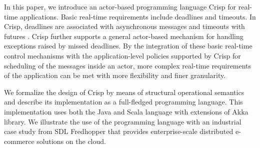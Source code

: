 In this paper, we introduce an actor-based programming language Crisp for real-time applications. 
Basic real-time requirements include deadlines and timeouts.
In Crisp, deadlines are associated with asynchronous messages and timeouts  with futures \cite{BoerCJ07}.
Crisp further supports a general actor-based mechanism for handling exceptions raised by  missed deadlines.
By the  integration  of these basic real-time control mechanisms with the application-level policies supported by Crisp for scheduling of the messages inside an actor,
more complex real-time requirements of the application can be met with more flexibility and finer granularity.

We formalize the design of Crisp by means of structural  operational semantics \cite{plotkin:sos} and 
describe its implementation as a full-fledged programming language.
This implementation uses both the Java and Scala language with extensions of Akka library.
We illustrate the use of the programming language with an industrial case study from SDL Fredhopper that provides enterprise-scale distributed e-commerce solutions on the cloud.

